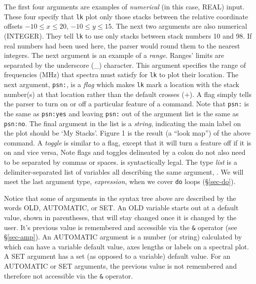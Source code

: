 The first four arguments are examples of {\it numerical\/} 
(in this case, REAL) input.
These four specify that {\tt lk} plot only those stacks
between the relative coordinate offsets $-10 \le x \le 20$, $-10 \le y \le 15$.
The next two arguments are also numerical (INTEGER). They tell {\tt lk} to 
use only stacks between stack numbers 10 and 98. If real numbers had 
been used here, the \COMB parser would round them to the nearest integers. 
The next argument is an example of a {\it range}. Ranges' limits are separated 
by the underscore (\_) character. This argument specifies the range of 
frequencies (MHz) that spectra must satisfy for {\tt lk} to plot their location. 
The next argument, {\tt psn:}, is a {\it flag\/} which makes {\tt lk} mark a  
location with the stack number(s) at that location rather than the default
crosses ($+$). A flag simply tells the parser to turn on or off a particular 
feature of a command. Note that {\tt psn:} is the same as {\tt psn:yes} and 
leaving {\tt psn:} out of the argument list is the same as {\tt psn:no}. The
final argument in the list is a {\it string}, indicating the main label
on the plot should be `My Stacks'. Figure 1 is the result (a ``look map'') 
of the above command. A {\it toggle\/} is similar to a flag, except that it 
will turn a feature off if it is on and vice versa, \eg
\smallskip
{}
\smallskip
\noindent Note flags and toggles delineated by a colon do not also need to be
separated by commas or spaces.
\smallskip
{}
\smallskip\noindent
is syntactically legal.
The type {\it list\/} is a delimiter-separated list of
variables all describing the same argument, .
We will meet the last argument type, {\it expression}, when we cover {\tt do} 
loops (\S \ref{sec-do}).

Notice that some of arguments in the syntax tree above are described by the
words OLD, AUTOMATIC, or SET.
An OLD variable starts out at a default value, shown in parentheses, 
that will stay changed once it is changed  by the user.
It's previous value is remembered and accessible via the {\tt \&} operator 
(see \S \ref{sec-amp}).
An AUTOMATIC argument is a number (or string) calculated by \COMB  
which can have a variable default value, \eg axes lengths or labels on a 
spectral plot.
A SET argument has a set (as opposed to a variable) default value. 
For an AUTOMATIC or SET arguments, the previous value is not 
remembered and therefore not accessible via the {\tt \&} operator. 

